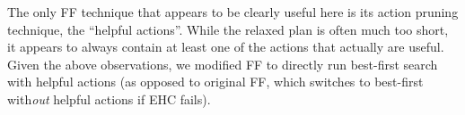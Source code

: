 
The only FF technique that appears to be clearly useful here is its
action pruning technique, the ``helpful actions''. While the relaxed
plan is often much too short, it appears to always contain at least
one of the actions that actually are useful. 
%
%
%
%
%
Given the above observations, we modified FF to directly run
best-first search with helpful actions (as
opposed to original FF, which switches to best-first with{\em out}
helpful actions if EHC fails).










